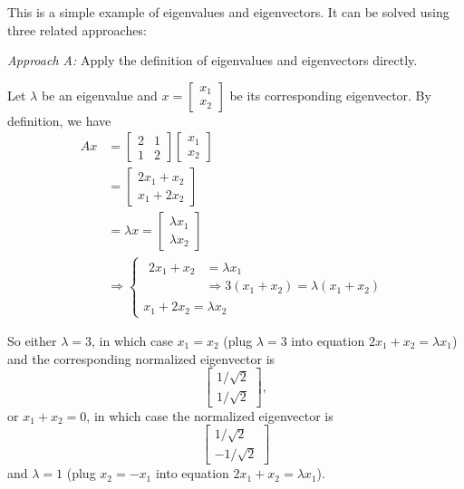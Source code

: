 \begin{solution}
This is a simple example of eigenvalues and eigenvectors. It can be solved using three related approaches:

\noindent\emph{Approach A:} Apply the definition of eigenvalues and eigenvectors directly.

Let \(\lambda\) be an eigenvalue and \(x=\begin{bmatrix}x_1\\x_2\end{bmatrix}\) be its corresponding eigenvector. By definition, we have
\[
\begin{aligned}
Ax&=\begin{bmatrix}2&1\\1&2\end{bmatrix}\begin{bmatrix}x_1\\x_2\end{bmatrix}\\
&=\begin{bmatrix}2x_1+x_2\\x_1+2x_2\end{bmatrix}\\
&=\lambda x=\begin{bmatrix}\lambda x_1\\\lambda x_2\end{bmatrix}\\
&\Rightarrow
\begin{cases}
\begin{aligned}
2x_1+x_2&=\lambda x_1\\
&\Rightarrow 3(x_1+x_2)=\lambda(x_1+x_2)
\end{aligned}\\
x_1+2x_2=\lambda x_2
\end{cases}
\end{aligned}
\]

So either \(\lambda=3\), in which case \(x_1=x_2\) (plug \(\lambda=3\) into equation \(2x_1+x_2=\lambda x_1\)) and the corresponding normalized eigenvector is
\[
\begin{bmatrix}1/\sqrt{2}\\1/\sqrt{2}\end{bmatrix},
\]
or \(x_1+x_2=0\), in which case the normalized eigenvector is
\[
\begin{bmatrix}1/\sqrt{2}\\-1/\sqrt{2}\end{bmatrix}
\]
and \(\lambda=1\) (plug \(x_2=-x_1\) into equation \(2x_1+x_2=\lambda x_1\)).


\end{solution}
